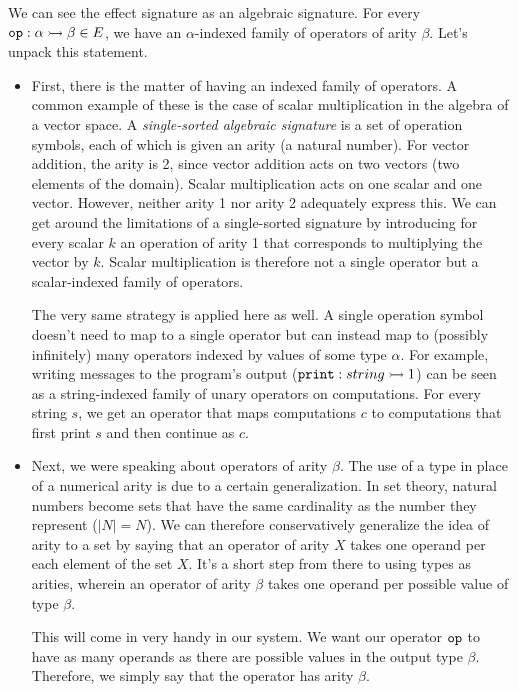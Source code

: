 We can see the effect signature as an algebraic signature. For every
$\mathtt{op} : \alpha \rightarrowtail \beta \in E$, we have an $\alpha$-indexed family of
operators of arity $\beta$. Let's unpack this statement.

\begin{itemize}
\item First, there is the matter of having an indexed family of
  operators. A common example of these is the case of scalar multiplication
  in the algebra of a vector space. A \emph{single-sorted algebraic
    signature} is a set of operation symbols, each of which is given an
  arity (a natural number). For vector addition, the arity is 2, since
  vector addition acts on two vectors (two elements of the
  domain). Scalar multiplication acts on one scalar and one
  vector. However, neither arity 1 nor arity 2 adequately express this. We
  can get around the limitations of a single-sorted signature by
  introducing for every scalar $k$ an operation of arity 1 that corresponds
  to multiplying the vector by $k$. Scalar multiplication is therefore not
  a single operator but a scalar-indexed family of operators.

  The very same strategy is applied here as well. A single operation symbol
  doesn't need to map to a single operator but can instead map to (possibly
  infinitely) many operators indexed by values of some type $\alpha$. For
  example, writing messages to the program's output
  ($\mathtt{print} : string \rightarrowtail 1$) can be seen as a string-indexed family of
  unary operators on computations. For every string $s$, we get an operator
  that maps computations $c$ to computations that first print $s$ and then
  continue as $c$.

\item Next, we were speaking about operators of arity $\beta$. The use of a
  type in place of a numerical arity is due to a certain generalization. In
  set theory, natural numbers become sets that have the same cardinality as
  the number they represent ($\left\vert N \right\vert = N$). We can
  therefore conservatively generalize the idea of arity to a set by saying
  that an operator of arity $X$ takes one operand per each element of the
  set $X$. It's a short step from there to using types as arities, wherein
  an operator of arity $\beta$ takes one operand per possible value of type
  $\beta$.

  This will come in very handy in our system. We want our operator
  $\mathtt{op}$ to have as many operands as there are possible values in the
  output type $\beta$. Therefore, we simply say that the operator has arity
  $\beta$.


\end{itemize}
